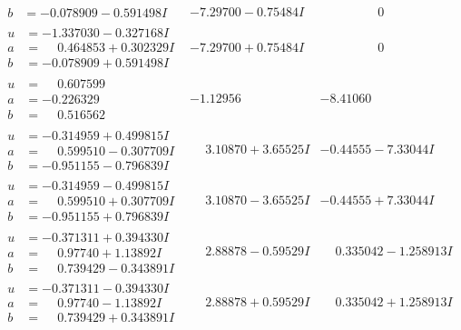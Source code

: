 \documentclass[1p]{elsarticle_modified}
\theoremstyle{definition}
\begin{document}
$$\begin{array}{c|c|c}
\begin{aligned}
b &= -0.078909 - 0.591498 I\end{aligned}
 & -7.29700 - 0.75484 I & \phantom{-0.000000 } 0 \\ \hline\begin{aligned}
u &= -1.337030 - 0.327168 I \\
a &= \phantom{-}0.464853 + 0.302329 I \\
b &= -0.078909 + 0.591498 I\end{aligned}
 & -7.29700 + 0.75484 I & \phantom{-0.000000 } 0 \\ \hline\begin{aligned}
u &= \phantom{-}0.607599\phantom{ +0.000000I} \\
a &= -0.226329\phantom{ +0.000000I} \\
b &= \phantom{-}0.516562\phantom{ +0.000000I}\end{aligned}
 & -1.12956\phantom{ +0.000000I} & -8.41060\phantom{ +0.000000I} \\ \hline\begin{aligned}
u &= -0.314959 + 0.499815 I \\
a &= \phantom{-}0.599510 - 0.307709 I \\
b &= -0.951155 - 0.796839 I\end{aligned}
 & \phantom{-}3.10870 + 3.65525 I & -0.44555 - 7.33044 I \\ \hline\begin{aligned}
u &= -0.314959 - 0.499815 I \\
a &= \phantom{-}0.599510 + 0.307709 I \\
b &= -0.951155 + 0.796839 I\end{aligned}
 & \phantom{-}3.10870 - 3.65525 I & -0.44555 + 7.33044 I \\ \hline\begin{aligned}
u &= -0.371311 + 0.394330 I \\
a &= \phantom{-}0.97740 + 1.13892 I \\
b &= \phantom{-}0.739429 - 0.343891 I\end{aligned}
 & \phantom{-}2.88878 - 0.59529 I & \phantom{-}0.335042 - 1.258913 I \\ \hline\begin{aligned}
u &= -0.371311 - 0.394330 I \\
a &= \phantom{-}0.97740 - 1.13892 I \\
b &= \phantom{-}0.739429 + 0.343891 I\end{aligned}
 & \phantom{-}2.88878 + 0.59529 I & \phantom{-}0.335042 + 1.258913 I \\ \hline\begin{aligned}

\end{aligned}
\end{array}$$
\end{document}
